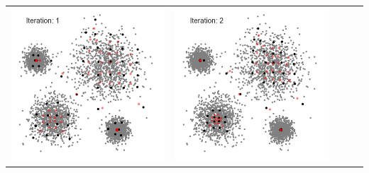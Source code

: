 \documentclass{beamer}
\begin{document}
\begin{frame}
{\begin{tabular}{ccccc}
	\includegraphics[scale=0.15]{meanshift/meanshift-6}&
	\includegraphics[scale=0.15]{meanshift/meanshift-8}&

\end{tabular}}
\end{frame}
\end{document}
